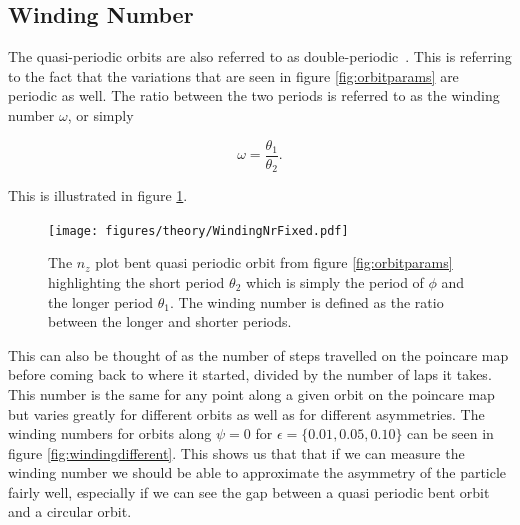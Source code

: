 \subsection{Winding Number} \label{sec:winding}
The quasi-periodic orbits are also referred to as double-periodic~\cite{Yarin}. This is referring to the fact that the variations that are seen in figure \ref{fig:orbitparams} are periodic as well. The ratio between the two periods is referred to as the winding number $\omega$, or simply

\begin{equation}\label{eq:winding}
\omega = \frac{\theta_1}{\theta_2}.
\end{equation}

This is illustrated in figure \ref{fig:windingDef}.

\begin{figure}[H]
\begin{center}
\texttt{[image: figures/theory/WindingNrFixed.pdf]}
\end{center}
\caption{The $n_z$ plot bent quasi periodic orbit from figure \ref{fig:orbitparams} highlighting the short period $\theta_2$ which is simply the period of $\phi$ and the longer period $\theta_1$. The winding number is defined as the ratio between the longer and shorter periods.}
\label{fig:windingDef}
\end{figure}

This can also be thought of as the number of steps travelled on the poincare map before coming back to where it 
started, divided by the number of laps it takes. This number is the same for any point along a given orbit on the 
poincare map but varies greatly for different orbits as well as for different asymmetries. The winding numbers for
 orbits along $\psi=0$ for $\epsilon=\{0.01, 0.05, 0.10\}$ can be seen in figure \ref{fig:windingdifferent}. This shows us that that if we can measure the winding number we should be able to approximate the asymmetry of the particle fairly well, especially if we can see the gap between a quasi periodic bent orbit and a circular orbit.
 
